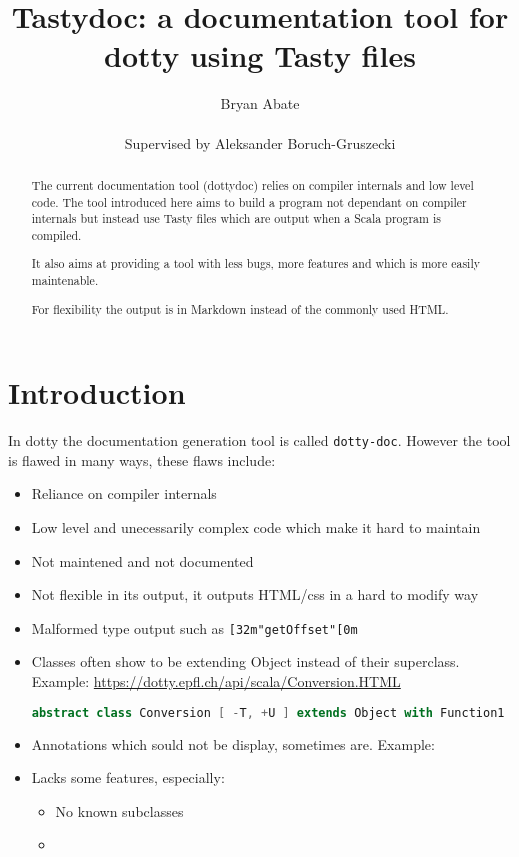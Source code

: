 \documentclass{report}
\begin{document}
\title{Tastydoc: a documentation tool for dotty using Tasty files}
\author{Bryan Abate
\\\\\small{Supervised by Aleksander Boruch-Gruszecki}}

\maketitle

\begin{abstract}
The current documentation tool (dottydoc) relies on compiler internals and low level code. The tool introduced here aims to build a program not dependant on compiler internals but instead use Tasty files which are output when a Scala program is compiled.

It also aims at providing a tool with less bugs, more features and which is more easily maintenable.

For flexibility the output is in Markdown instead of the commonly used HTML.
\end{abstract}

\tableofcontents

\chapter{Introduction}
In dotty the documentation generation tool is called \texttt{dotty-doc}. However the tool is flawed in many ways, these flaws include:
\begin{itemize}
    \item Reliance on compiler internals
    \item Low level and unecessarily complex code which make it hard to maintain
    \item Not maintened and not documented
    \item Not flexible in its output, it outputs HTML/css in a hard to modify way
    \item Malformed type output such as \texttt{[32m"getOffset"[0m}
    \item Classes often show to be extending Object instead of their superclass. Example: \url{https://dotty.epfl.ch/api/scala/Conversion.HTML}
\begin{lstlisting}[language=scala]
abstract class Conversion [ -T, +U ] extends Object with Function1
\end{lstlisting}
    \item Annotations which sould not be display, sometimes are. Example:
    \item Lacks some features, especially:
    \begin{itemize}
        \item No known subclasses
        \item 
    \end{itemize}
\end{itemize}
\end{document}

